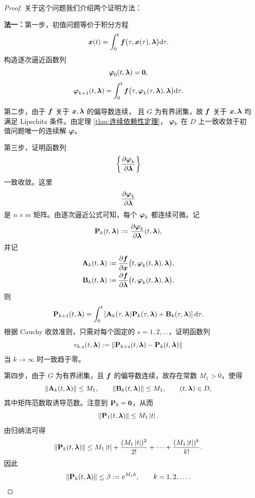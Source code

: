 \begin{proof}
	关于这个问题我们介绍两个证明方法：
	
	\textbf{法一：}第一步，初值问题等价于积分方程
	\[
		\boldsymbol{x}(t)=\int_0^t
		\boldsymbol{f}\bigl(\tau,\boldsymbol{x}(\tau),\boldsymbol{\lambda}\bigr)\mathrm{d}\tau.
	\]
	构造逐次逼近函数列
	\[
		\boldsymbol{\varphi}_0(t,\boldsymbol{\lambda})=\boldsymbol{0},
	\]
	\[
		\boldsymbol{\varphi}_{k+1}(t,\boldsymbol{\lambda})
		=\int_0^t
		\boldsymbol{f}\bigl(
		\tau,\boldsymbol{\varphi}_k(\tau,\boldsymbol{\lambda}),\boldsymbol{\lambda}
		\bigr)\mathrm{d}\tau.
	\]

	第二步，由于 $\boldsymbol{f}$ 关于 $\boldsymbol{x},\boldsymbol{\lambda}$ 的偏导数连续，
	且 $G$ 为有界闭集，故 $\boldsymbol{f}$ 关于 $\boldsymbol{x},\boldsymbol{\lambda}$
	均满足 Lipschitz 条件。由定理 \ref{thm:连续依赖性定理}，
	$\boldsymbol{\varphi}_k$ 在 $D$ 上一致收敛于初值问题唯一的连续解
	$\boldsymbol{\varphi}$。

	第三步，证明函数列
	\[
		\left\{
		\dfrac{\partial\boldsymbol{\varphi}_k}{\partial\boldsymbol{\lambda}}
		\right\}
	\]
	一致收敛。这里
	\[
		\dfrac{\partial\boldsymbol{\varphi}_k}
		{\partial\boldsymbol{\lambda}}
	\]
	是 $n\times m$ 矩阵。由逐次逼近公式可知，每个
	$\boldsymbol{\varphi}_k$ 都连续可微。记
	\[
		\mathbf{P}_k(t,\boldsymbol{\lambda})
		\mathrel{:=}
		\dfrac{\partial\boldsymbol{\varphi}_k}
		{\partial\boldsymbol{\lambda}}(t,\boldsymbol{\lambda}),
	\]
	并记
	\[
		\begin{aligned}
		\mathbf{A}_k(t,\boldsymbol{\lambda})
		&\mathrel{:=}
		\dfrac{\partial\boldsymbol{f}}{\partial\boldsymbol{x}}
		\bigl(t,\boldsymbol{\varphi}_k(t,\boldsymbol{\lambda}),\boldsymbol{\lambda}\bigr),\\
		\mathbf{B}_k(t,\boldsymbol{\lambda})
		&\mathrel{:=}
		\dfrac{\partial\boldsymbol{f}}{\partial\boldsymbol{\lambda}}
		\bigl(t,\boldsymbol{\varphi}_k(t,\boldsymbol{\lambda}),\boldsymbol{\lambda}\bigr).
		\end{aligned}
	\]
	则
	\[
		\mathbf{P}_{k+1}(t,\boldsymbol{\lambda})
		=\int_0^t\left[
		\mathbf{A}_k(\tau,\boldsymbol{\lambda})
		\mathbf{P}_k(\tau,\boldsymbol{\lambda})
		+\mathbf{B}_k(\tau,\boldsymbol{\lambda})
		\right]\mathrm{d}\tau.
	\]
	根据 Cauchy 收敛准则，只需对每个固定的
	$s=1,2,\ldots$，证明函数列
	\[
		v_{k,s}(t,\boldsymbol{\lambda})\mathrel{:=}
		\left\| 
		\mathbf{P}_{k+s}(t,\boldsymbol{\lambda})
		-\mathbf{P}_k(t,\boldsymbol{\lambda})
		 \right\|
	\]
	当 $k\to\infty$ 时一致趋于零。

	第四步，由于 $G$ 为有界闭集，且 $\boldsymbol{f}$ 的偏导数连续，故存在常数
	$M_1>0$，使得
	\[
		\left\| \mathbf{A}_k(t,\boldsymbol{\lambda}) \right\|\leq M_1,
		\qquad
		\left\| \mathbf{B}_k(t,\boldsymbol{\lambda}) \right\|\leq M_1,
		\qquad (t,\boldsymbol{\lambda})\in D,
	\]
	其中矩阵范数取诱导范数。注意到 $\mathbf{P}_0=\mathbf{0}$，从而
	\[
		\left\| \mathbf{P}_1(t,\boldsymbol{\lambda}) \right\|
		\leq M_1\left| t \right|.
	\]
	由归纳法可得
	\[
		\left\| \mathbf{P}_k(t,\boldsymbol{\lambda}) \right\|
		\leq M_1\left| t \right|
		+\dfrac{(M_1\left| t \right|)^2}{2!}
		+\cdots
		+\dfrac{(M_1\left| t \right|)^k}{k!}.
	\]
	因此
	\[
		\left\| \mathbf{P}_k(t,\boldsymbol{\lambda}) \right\|
		\leq\beta\mathrel{:=}e^{M_1h},
		\qquad k=1,2,\ldots.
	\]


\end{proof}
